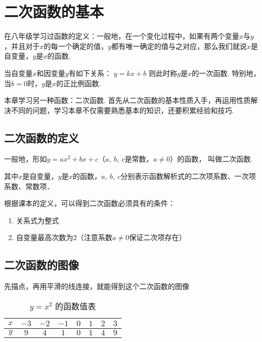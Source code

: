 \section{二次函数的基本}

在八年级学习过函数的定义：一般地，在一个变化过程中，如果有两个变量\(x\)与\(y\)，并且对于\(x\)的每一个确定的值，\(y\)都有唯一确定的值与之对应，那么我们就说\(x\)是自变量，\(y\)是\(x\)的函数.
\par
当自变量\(x\)和因变量\(y\)有如下关系：
\(y=kx+b\)
则此时称\(y\)是\(x\)的一次函数. 特别地，当\(b=0\)时，\(y\)是\(x\)的正比例函数.
\par
本章学习另一种函数：二次函数. 首先从二次函数的基本性质入手，再运用性质解决不同的问题，学习本章不仅需要熟悉基本的知识，还要积累经验和技巧.


\subsection{二次函数的定义}

\begin{definition}
一般地，形如\(y=ax^2+bx+c\)（\(a,\ b,\ c\)是常数，\(a\ne0\)）的函数， 叫做二次函数.
\par
其中\(x\)是自变量，\(y\)是\(x\)的函数，\(a,\ b,\ c\)分别表示函数解析式的二次项系数、一次项系数、常数项．
\end{definition}

根据课本的定义，可以得到二次函数必须具有的条件：
\begin{enumerate}
    \item 关系式为整式
    \item 自变量最高次数为2（注意系数\(a\ne0\)保证二次项存在）
\end{enumerate}

\subsection{二次函数的图像}

先描点，再用平滑的线连接，就能得到这个二次函数的图像


\begin{table}[h]
\centering
\renewcommand{\arraystretch}{1.2} %
\begin{tabular}{|c|*{7}{c|}} \hline
\( x \) & \(-3\) & \(-2\) & \(-1\) & \(0\) & \(1\) & \(2\) & \(3\) \\ \hline\hline
\( y \) & \(9\) & \(4\) & \(1\) & \(0\) & \(1\) & \(4\) & \(9\) \\ \hline
\end{tabular}
\caption{\( y = x^2 \) 的函数值表}
\end{table}


